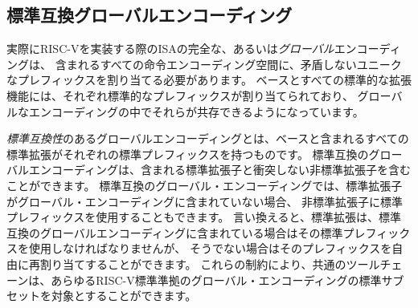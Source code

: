 \subsection*{標準互換グローバルエンコーディング}

\begin{comment}
A complete or {\em global} encoding of an ISA for an actual RISC-V
implementation must allocate a unique non-conflicting prefix for every
included instruction encoding space.  The bases and every standard
extension have each had a standard prefix allocated to ensure they can
all coexist in a global encoding.
\end{comment}
実際にRISC-Vを実装する際のISAの完全な、あるいは{\em グローバル}エンコーディングは、
含まれるすべての命令エンコーディング空間に、矛盾しないユニークなプレフィックスを割り当てる必要があります。
ベースとすべての標準的な拡張機能には、それぞれ標準的なプレフィックスが割り当てられており、
グローバルなエンコーディングの中でそれらが共存できるようになっています。

\begin{comment}
A {\em standard-compatible} global encoding is one where the base and
every included standard extension have their standard prefixes.  A
standard-compatible global encoding can include non-standard
extensions that do not conflict with the included standard extensions.
A standard-compatible global encoding can also use standard prefixes
for non-standard extensions if the associated standard extensions are
not included in the global encoding.  In other words, a standard
extension must use its standard prefix if included in a
standard-compatible global encoding, but otherwise its prefix is free
to be reallocated.  These constraints allow a common toolchain to
target the standard subset of any RISC-V standard-compatible global
encoding.
\end{comment}

{\em 標準互換性}のあるグローバルエンコーディングとは、ベースと含まれるすべての標準拡張がそれぞれの標準プレフィックスを持つものです。
標準互換のグローバルエンコーディングは、含まれる標準拡張子と衝突しない非標準拡張子を含むことができます。
標準互換のグローバル・エンコーディングでは、標準拡張子がグローバル・エンコーディングに含まれていない場合、
非標準拡張子に標準プレフィックスを使用することもできます。
言い換えると、標準拡張は、標準互換のグローバルエンコーディングに含まれている場合はその標準プレフィックスを使用しなければなりませんが、
そうでない場合はそのプレフィックスを自由に再割り当てすることができます。
これらの制約により、共通のツールチェーンは、あらゆるRISC-V標準準拠のグローバル・エンコーディングの標準サブセットを対象とすることができます。

